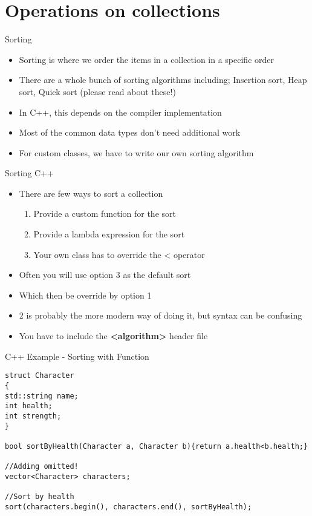 \part{Operations on collections}
\frame{\partpage}

\begin{frame}{Sorting}
	\begin{itemize}
		\pause \item Sorting is where we order the items in a collection in a specific order
		\pause \item There are a whole bunch of sorting algorithms including; Insertion sort, Heap sort, Quick sort (please read about these!)
		\pause \item In C++, this depends on the compiler implementation 
		\pause \item Most of the common data types don't need additional work
		\pause \item For custom classes, we have to write our own sorting algorithm
	\end{itemize}
\end{frame}

\begin{frame}{Sorting C++}
\begin{itemize}
	\pause \item There are few ways to sort a collection
	\begin{enumerate}
		\pause \item Provide a custom function for the sort
		\pause \item Provide a lambda expression for the sort
		\pause \item Your own class has to override the < operator
	\end{enumerate}
	\pause \item Often you will use option 3 as the default sort
	\pause \item Which then be override by option 1 
	\pause \item 2 is probably the more modern way of doing it, but syntax can be confusing
	\pause \item You have to include the \textbf{<algorithm>} header file
\end{itemize}
\end{frame}

\begin{frame}[fragile]{C++ Example - Sorting with Function }
\begin{lstlisting}
struct Character
{
std::string name;
int health;
int strength;
}

bool sortByHealth(Character a, Character b){return a.health<b.health;}

//Adding omitted!
vector<Character> characters;

//Sort by health
sort(characters.begin(), characters.end(), sortByHealth);
\end{lstlisting}
\end{frame}

